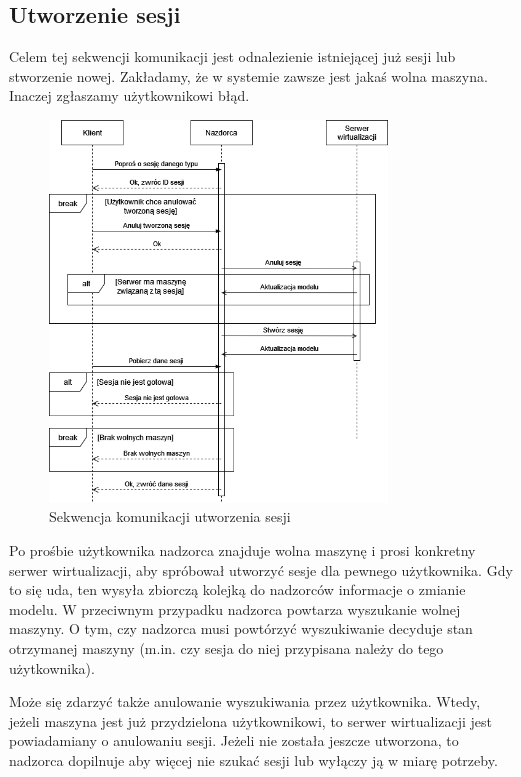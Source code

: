 \documentclass[../opis-rozwiazania.tex]{subfiles}
\begin{document}
\label{communication-sec}

\subsection{Utworzenie sesji}

Celem tej sekwencji komunikacji jest odnalezienie istniejącej już sesji lub stworzenie nowej.
Zakładamy, że w systemie zawsze jest jakaś wolna maszyna.
Inaczej zgłaszamy użytkownikowi błąd.

\begin{figure}[H]
  \centering
  \includegraphics[width=0.8\textwidth]{../diagrams/sequence_diagrams/tworzenie_sesji_v2.png}
  \caption{Sekwencja komunikacji utworzenia sesji}
  \label{figure:diagrams:sequence_diagrams:tworzenie_sesji}
\end{figure}

Po prośbie użytkownika nadzorca znajduje wolna maszynę i prosi konkretny serwer wirtualizacji, aby spróbował utworzyć sesje dla pewnego użytkownika.
Gdy to się uda, ten wysyła zbiorczą kolejką do nadzorców informacje o zmianie modelu.
W przeciwnym przypadku nadzorca powtarza wyszukanie wolnej maszyny.
O tym, czy nadzorca musi powtórzyć wyszukiwanie decyduje stan otrzymanej maszyny (m.in. czy sesja do niej przypisana należy do tego użytkownika).

Może się zdarzyć także anulowanie wyszukiwania przez użytkownika.
Wtedy, jeżeli maszyna jest już przydzielona użytkownikowi, to serwer wirtualizacji jest powiadamiany o anulowaniu sesji.
Jeżeli nie została jeszcze utworzona, to nadzorca dopilnuje aby więcej nie szukać sesji lub wyłączy ją w miarę potrzeby.
\end{document}
